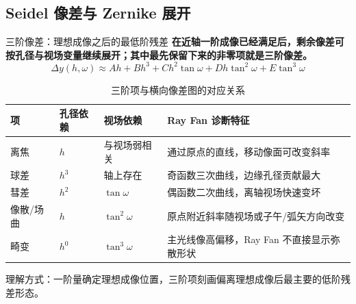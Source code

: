 \subsection{Seidel 像差与 Zernike 展开}
\label{sec:1.3}

\begin{frame}{三阶像差：理想成像之后的最低阶残差}
\label{1.7}
    \small
    \textbf{在近轴一阶成像已经满足后，剩余像差可按孔径与视场变量继续展开；其中最先保留下来的非零项就是三阶像差。}
    \begin{equation}
        \Delta y(h,\omega)
        \approx A h
        + B h^3
        + C h^2\tan\omega
        + D h\tan^2\omega
        + E\tan^3\omega
        \label{eq:rayfan_third_order}
    \end{equation}

    \vspace{-2pt}
    \begin{table}
        \centering
        \scriptsize
        \renewcommand{\arraystretch}{1.25}
        \begin{tabular}{p{2.1cm}|p{2.2cm}|p{2.5cm}|p{4.5cm}}
            \toprule
            \textbf{项} & \textbf{孔径依赖} & \textbf{视场依赖} & \textbf{Ray Fan 诊断特征} \\
            \midrule
            离焦 & $h$ & 与视场弱相关 & 通过原点的直线，移动像面可改变斜率 \\
            球差 & $h^3$ & 轴上存在 & 奇函数三次曲线，边缘孔径贡献最大 \\
            彗差 & $h^2$ & $\tan\omega$ & 偶函数二次曲线，离轴视场快速变坏 \\
            像散/场曲 & $h$ & $\tan^2\omega$ & 原点附近斜率随视场或子午/弧矢方向改变 \\
            畸变 & $h^0$ & $\tan^3\omega$ & 主光线像高偏移，Ray Fan 不直接显示弥散形状 \\
            \bottomrule
        \end{tabular}
        \caption{三阶项与横向像差图的对应关系}
        \label{tab:third_order_rayfan_main}
    \end{table}

    \alert{理解方式：}一阶量确定理想成像位置，三阶项刻画偏离理想成像后最主要的低阶残差形态。
\end{frame}

